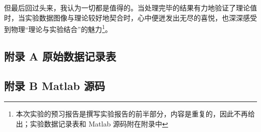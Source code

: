 \documentclass[UTF8]{article}
\theoremstyle{MyLineTheoremStyle} %
\theoremstyle{MyBlockTheoremStyle} %
\theoremstyle{MySubsubsectionStyle} %
\begin{document}
但最后回过头来，我认为一切都是值得的。当处理完毕的结果有力地验证了理论值时，当实验数据图像与理论较好地契合时，心中便迸发出无尽的喜悦，也深深感受到物理“理论与实验结合”的魅力\footnote{本次实验的预习报告是撰写实验报告的前半部分，内容是重复的，因此不再给出；实验数据记录表和 Matlab 源码附在附录中}。





\newpage
\subsection*{附录 A\hspace*{20pt} 原始数据记录表}
\thispagestyle{fancy} 

\begin{figure}[H]\centering
    
\end{figure}


\subsection*{附录 B\hspace*{20pt} Matlab 源码}
\thispagestyle{fancy} 

\end{document}
